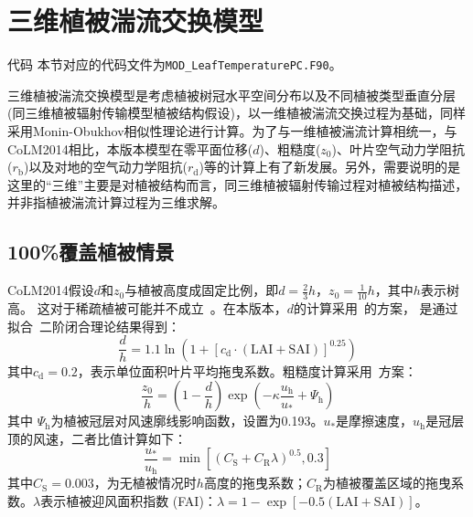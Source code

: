 \section{三维植被湍流交换模型}\label{三维植被湍流}
\begin{mymdframed}{代码}
  本节对应的代码文件为\texttt{MOD\_LeafTemperaturePC.F90}。
\end{mymdframed}

三维植被湍流交换模型是考虑植被树冠水平空间分布以及不同植被类型垂直分层(同三维植被辐射传输模型植被结构假设)，以一维植被湍流交换过程为基础，同样采用Monin-Obukhov相似性理论进行计算。为了与一维植被湍流计算相统一，与CoLM2014相比，本版本模型在零平面位移($d$)、粗糙度($z_0$)、叶片空气动力学阻抗($r_{\mathrm {b}}$)以及对地的空气动力学阻抗($r_{\mathrm {d}}$)等的计算上有了新发展。另外，需要说明的是这里的“三维”主要是对植被结构而言，同三维植被辐射传输过程对植被结构描述，并非指植被湍流计算过程为三维求解。


\subsection{100\%覆盖植被情景}\label{百分百植被覆盖湍流}
CoLM2014假设$d$和$z_0$与植被高度成固定比例，即$d=\frac{2}{3}h$，$z_0=\frac{1}{10}h$，其中$h$表示树高。
这对于稀疏植被可能并不成立~\citep{zeng2007consistent}。在本版本，$d$的计算采用~\citet{choudhury1988}的方案，
是通过拟合~\citet{shaw1982aerodynamic}二阶闭合理论结果得到：
\begin{equation}\label{dOh}
  \frac{d}{h}=1.1 \ln \left (1+\left[c_{\mathrm{d}} \cdot (\text {LAI} + \text {SAI})\right]^{0.25} \right)
\end{equation}
其中$c_{\mathrm {d}}=0.2$，表示单位面积叶片平均拖曳系数。粗糙度计算采用~\citet{raupach1992drag,raupach1994simplified}方案：
\begin{equation}\label{zOh}
  \frac{z_{0}}{h}=\left(1-\frac{d}{h}\right) \exp \left(-\kappa \frac{u_{\mathrm{h}}}{u_{*}}+\Psi_{\mathrm{h}}\right)
\end{equation}
其中%
$\Psi_{\mathrm h}$为植被冠层对风速廓线影响函数，设置为0.193。$u_\ast$是摩擦速度，$u_{\mathrm h}$是冠层顶的风速，二者比值计算如下：
\begin{equation}\label{ustrarOuh}
  \frac{u_{*}}{u_{\mathrm{h}}}=\min \left[\left(C_{\mathrm{S}}+C_{\mathrm{R}} \lambda\right)^{0.5}, 0.3\right]
\end{equation}
其中$C_{\mathrm {S}}=0.003$，为无植被情况时$h$高度的拖曳系数；$C_{\mathrm {R}}$为植被覆盖区域的拖曳系数。$\lambda$表示植被迎风面积指数 (FAI)：$\lambda=1-\exp{\left[-0.5 (\text {LAI}+\text {SAI})\right]}$。


